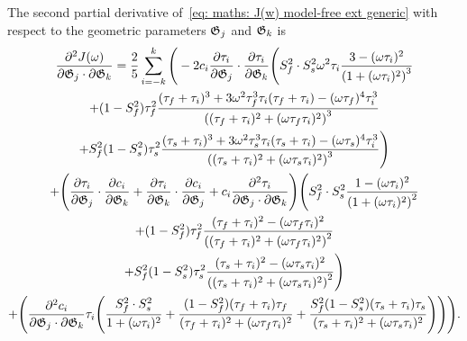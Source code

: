 The second partial derivative of~\eqref{eq: maths: J(w) model-free ext generic} with respect to the geometric parameters $\mathfrak{G}_j$ and $\mathfrak{G}_k$ is
\begin{multline}
    \frac{\partial^2 J(\omega)}{\partial \mathfrak{G}_j \cdot \partial \mathfrak{G}_k} = \frac{2}{5} \sum_{i=-k}^k \Bigg(
        -2 c_i \frac{\partial \tau_i}{\partial \mathfrak{G}_j} \cdot \frac{\partial \tau_i}{\partial \mathfrak{G}_k} \Bigg(
            S^2_f \cdot S^2_s \omega^2 \tau_i \frac{3 - (\omega \tau_i)^2}{\left(1 + (\omega \tau_i)^2 \right)^3}  \\
            + (1 - S^2_f) \tau_f^2 \frac{(\tau_f + \tau_i)^3  +  3 \omega^2 \tau_f^3 \tau_i (\tau_f + \tau_i)  -  (\omega \tau_f)^4 \tau_i^3}
                {\left((\tau_f + \tau_i)^2 + (\omega \tau_f \tau_i)^2 \right)^3} \\
            + S^2_f(1 - S^2_s) \tau_s^2 \frac{(\tau_s + \tau_i)^3  +  3 \omega^2 \tau_s^3 \tau_i (\tau_s + \tau_i)  -  (\omega \tau_s)^4 \tau_i^3}
                {\left((\tau_s + \tau_i)^2 + (\omega \tau_s \tau_i)^2 \right)^3}
        \Bigg) \\
        + \Bigg(
            \frac{\partial \tau_i}{\partial \mathfrak{G}_j} \cdot \frac{\partial c_i}{\partial \mathfrak{G}_k}
            + \frac{\partial \tau_i}{\partial \mathfrak{G}_k} \cdot \frac{\partial c_i}{\partial \mathfrak{G}_j}
            + c_i \frac{\partial^2 \tau_i}{\partial \mathfrak{G}_j \cdot \partial \mathfrak{G}_k}
        \Bigg)
        \Bigg(
            S^2_f \cdot S^2_s \frac{1 - (\omega \tau_i)^2}{\left(1 + (\omega \tau_i)^2 \right)^2} \\
            + (1 - S^2_f) \tau_f^2 \frac{(\tau_f + \tau_i)^2 - (\omega \tau_f \tau_i)^2}{\left((\tau_f + \tau_i)^2 + (\omega \tau_f \tau_i)^2 \right)^2} \\
            + S^2_f(1 - S^2_s) \tau_s^2 \frac{(\tau_s + \tau_i)^2 - (\omega \tau_s \tau_i)^2}{\left((\tau_s + \tau_i)^2 + (\omega \tau_s \tau_i)^2 \right)^2}
        \Bigg) \\
        + \Bigg(
            \frac{\partial^2 c_i}{\partial \mathfrak{G}_j \cdot \partial \mathfrak{G}_k} \tau_i \Bigg(
                \frac{S^2_f \cdot S^2_s}{1 + (\omega \tau_i)^2}
                + \frac{(1 - S^2_f)(\tau_f + \tau_i)\tau_f}{(\tau_f + \tau_i)^2 + (\omega \tau_f \tau_i)^2}
                + \frac{S^2_f(1 - S^2_s)(\tau_s + \tau_i)\tau_s}{(\tau_s + \tau_i)^2 + (\omega \tau_s \tau_i)^2}
            \Bigg)
        \Bigg)
    \Bigg).
\end{multline}
                


